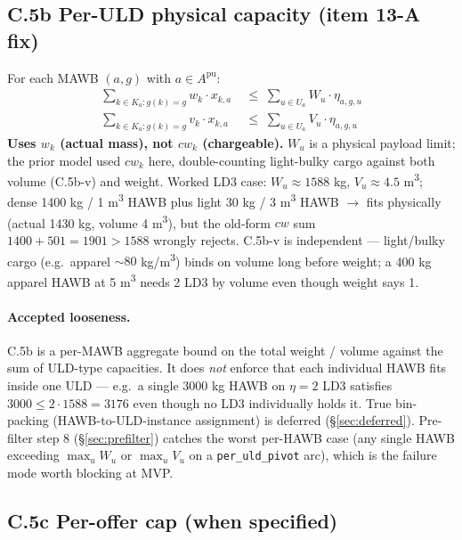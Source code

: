 \documentclass[11pt,a4paper]{article}
\theoremstyle{definition}
\begin{document}
\subsection*{C.5b Per-ULD physical capacity (item 13-A fix)}

For each MAWB $(a, g)$ with $a \in A^{\text{pu}}$:
\begin{align}
  \sum_{k \in K_a : g(k) = g} w_k \cdot x_{k,a}
    &\;\leq\; \sum_{u \in U_a} W_u \cdot \eta_{a,g,u}
    \tag{C.5b-w} \label{eq:C5b-w} \\
  \sum_{k \in K_a : g(k) = g} v_k \cdot x_{k,a}
    &\;\leq\; \sum_{u \in U_a} V_u \cdot \eta_{a,g,u}
    \tag{C.5b-v} \label{eq:C5b-v}
\end{align}
\textbf{Uses $w_k$ (actual mass), not $cw_k$ (chargeable).} $W_u$ is a
physical payload limit; the prior model used $cw_k$ here, double-counting
light-bulky cargo against both volume (C.5b-v) and weight. Worked LD3 case:
$W_u \approx 1588$ kg, $V_u \approx 4.5$ m\textsuperscript{3}; dense 1400 kg
/ 1 m\textsuperscript{3} HAWB plus light 30 kg / 3 m\textsuperscript{3} HAWB
$\to$ fits physically (actual 1430 kg, volume 4 m\textsuperscript{3}), but
the old-form $cw$ sum $1400 + 501 = 1901 > 1588$ wrongly rejects. C.5b-v is
independent --- light/bulky cargo (e.g.\ apparel $\sim 80$ kg/m\textsuperscript{3})
binds on volume long before weight; a 400 kg apparel HAWB at 5
m\textsuperscript{3} needs 2 LD3 by volume even though weight says 1.

\paragraph{Accepted looseness.}
C.5b is a per-MAWB aggregate bound on the total weight / volume against the
sum of ULD-type capacities. It does \emph{not} enforce that each individual
HAWB fits inside one ULD --- e.g.\ a single 3000 kg HAWB on $\eta = 2$ LD3
satisfies $3000 \leq 2 \cdot 1588 = 3176$ even though no LD3 individually
holds it. True bin-packing (HAWB-to-ULD-instance assignment) is deferred
(\S\ref{sec:deferred}). Pre-filter step 8 (\S\ref{sec:prefilter}) catches the
worst per-HAWB case (any single HAWB exceeding $\max_u W_u$ or $\max_u V_u$
on a \texttt{per\_uld\_pivot} arc), which is the failure mode worth blocking
at MVP.

\subsection*{C.5c Per-offer cap (when specified)}
\end{document}
